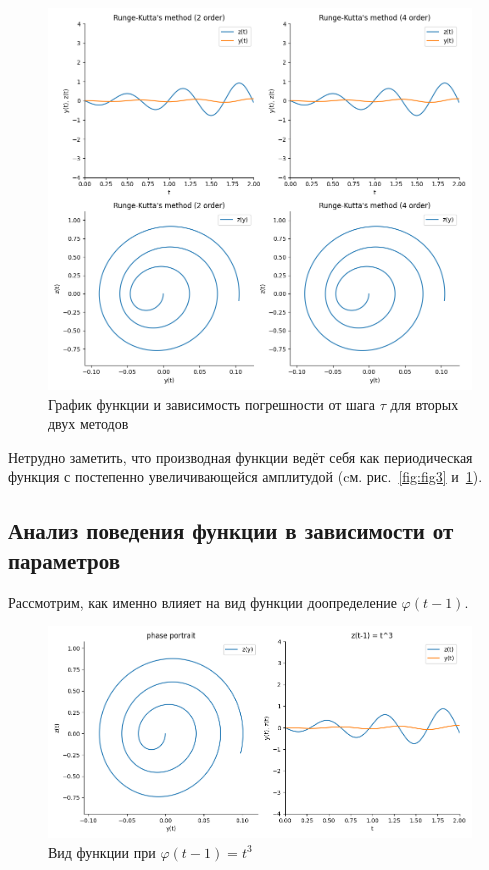\documentclass[a4paper,12pt]{article}
\begin{document}
	  \begin{figure}[ht!]
		\begin{center}
		\includegraphics[scale=0.38]{figures/Figure_worked3.png}
		\end{center}
		\vspace*{-8mm}
		\caption{График функции и зависимость погрешности от шага $\tau$ для вторых двух методов}\label{fig:fig4}
  	\end{figure}

	Нетрудно заметить, что производная функции ведёт себя как периодическая 
	функция с постепенно увеличивающейся амплитудой (cм. рис.~\ref{fig:fig3} и~\ref{fig:fig4}).

	\newpage
	\subsection{Анализ поведения функции в зависимости от параметров}
	Рассмотрим, как именно влияет на вид функции доопределение 
	$\varphi(t-1)$.

	\begin{figure}[ht!]
		\begin{center}
		\includegraphics[scale=0.65]{figures/fnc1.png}
		\end{center}
		\vspace*{-8mm}
		\caption{Вид функции при $\varphi(t-1) = t^3$}\label{fig:fig6}
  	\end{figure}
\end{document}
